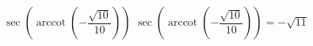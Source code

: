  {$\sec\left(\operatorname{arccot}\left(-\dfrac{\sqrt{10}}{10}\right)\right)$}
{ $\sec\left(\operatorname{arccot}\left(-\dfrac{\sqrt{10}}{10}\right)\right) = -\sqrt{11}$}
